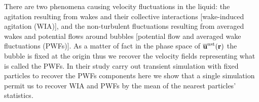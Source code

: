There are two phenomena causing velocity fluctuations in the liquid:
the agitation resulting from wakes and their collective interactions [wake-induced agitation (WIA)], and the non-turbulent fluctuations resulting from averaged wakes and potential flows around bubbles [potential flow and averaged wake fluctuations (PWFs)].
As a matter of fact in the phase space of $\overline{\textbf{u}}^\text{nst}(\textbf{r})$ the bubble is fixed at the origin thus we recover the velocity fields representing what is called the PWFs. 
In their study \citet{du2022analysis} carry out transient simulation with fixed particles to recover the PWFs components here we show that a single simulation permit us to recover WIA and PWFs by the mean of the nearest particles' statistics. 






